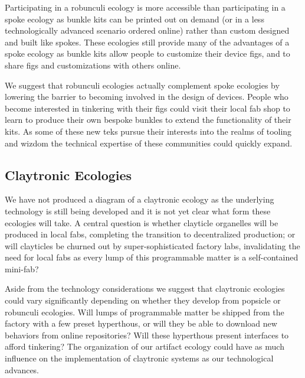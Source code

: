 Participating in a robunculi ecology is more accessible than participating in a spoke ecology as bunkle kits can be printed out on demand (or in a less technologically advanced scenario ordered online) rather than custom designed and built like spokes. These ecologies still provide many of the advantages of a spoke ecology as bunkle kits allow people to customize their device figs, and to share figs and customizations with others online.

We suggest that robunculi ecologies actually complement spoke ecologies by lowering the barrier to becoming involved in the design of devices. 
People who become interested in tinkering with their figs could visit their local fab shop to learn to produce their own bespoke bunkles to extend the functionality of their kits.
As some of these new teks pursue their interests into the realms of tooling and wizdom the technical expertise of these communities could quickly expand.

\subsection{Claytronic Ecologies}    
%
We have not produced a diagram of a claytronic ecology as the underlying technology is still being developed and it is not yet clear what form these ecologies will take. 
A central question is whether clayticle organelles will be produced in local fabs, completing the transition to decentralized production; or will clayticles be churned out by super-sophisticated factory labs, invalidating the need for local fabs as every lump of this programmable matter is a self-contained mini-fab?

Aside from the technology considerations we suggest that claytronic ecologies could vary significantly depending on whether they develop from popsicle or robunculi ecologies. Will lumps of programmable matter be shipped from the factory with a few preset hyperthous, or will they be able to download new behaviors from online repositories? Will these hyperthous present interfaces to afford tinkering? The organization of our artifact ecology could have as much influence on the implementation of claytronic systems as our technological advances.

